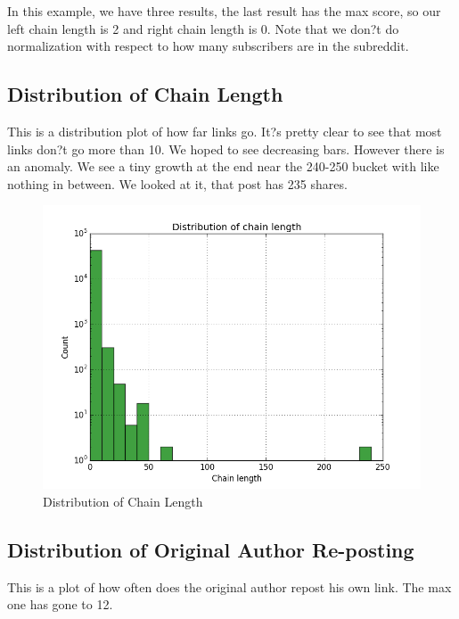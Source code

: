 \documentclass{article} %
\begin{document}
In this example, we have three results, the last result has the max score, so our left chain length is 2 and right chain length is 0.  Note that we don?t do normalization with respect to how many subscribers are in the subreddit.

\subsection{Distribution of Chain Length}

This is a distribution plot of how far links go. It?s pretty clear to see that most links don?t go more than 10. We hoped to see decreasing bars. However there is an anomaly. We see a tiny growth at the end near the 240-250 bucket with like nothing in between. We looked at it, that post has 235 shares.

\begin{figure}[h]
\begin{center}
\includegraphics[width=5in]{lengths.png}
\caption{Distribution of Chain Length}
\end{center}
\end{figure}


\subsection{Distribution of Original Author Re-posting}

This is a plot of how often does the original author repost his own link. The max one has gone to 12. 
\end{document}
